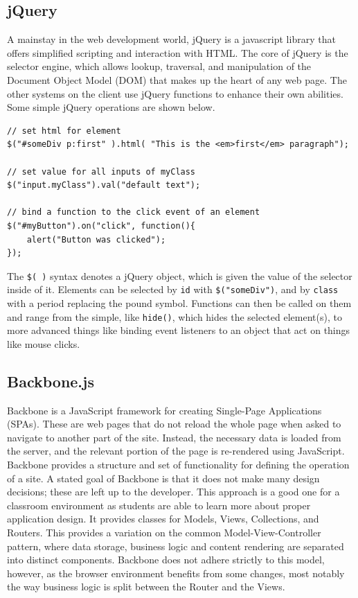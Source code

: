 \documentclass[12pt]{article}
\newcommand{\comment}[1]{{\bf \tt  {#1}}}
\newcommand{\emcomment}[1]{\textcolor{ForestGreen}{\comment{Elena: {#1}}}}
\newcommand{\code}[1]{{\texttt {#1}}}
\begin{document}
\subsection{jQuery}\label{sec:jquery}
A mainstay in the web development world, jQuery is a javascript library that offers simplified scripting and interaction with HTML. The core of jQuery is the selector engine, which allows lookup, traversal, and manipulation of the Document Object Model (DOM) that makes up the heart of any web page. The other systems on the client use jQuery functions to enhance their own abilities. Some simple jQuery operations are shown below.
\begin{verbatim}
// set html for element
$("#someDiv p:first" ).html( "This is the <em>first</em> paragraph");

// set value for all inputs of myClass
$("input.myClass").val("default text");

// bind a function to the click event of an element
$("#myButton").on("click", function(){
    alert("Button was clicked");
});
\end{verbatim}
The \code{\$( )} syntax denotes a jQuery object, which is given the value of the selector inside of it. Elements can be selected by \code{id} with \code{\$("someDiv")}, and by \code{class} with a period replacing the pound symbol. Functions can then be called on them and range from the simple, like \code{hide()}, which hides the selected element(s), to more advanced things like binding event listeners to an object that act on things like mouse clicks.


\subsection{Backbone.js}\label{sec:backbone}
Backbone is a JavaScript framework for creating Single-Page Applications (SPAs). These are web pages that do not reload the whole page when asked to navigate to another part of the site. Instead, the necessary data is loaded from the server, and the relevant portion of the page is re-rendered using JavaScript. Backbone provides a structure and set of functionality for defining the operation of a site. A stated goal of Backbone is that it does not make many design decisions; these are left up to the developer. This approach is a good one for a classroom environment as students are able to learn more about proper application design. It provides classes for Models, Views, Collections, and Routers. This provides a variation on the common Model-View-Controller pattern, where data storage, business logic and content rendering are separated into distinct components. Backbone does not adhere strictly to this model, however, as the browser environment benefits from some changes, most notably the way business logic is split between the Router and the Views.
\end{document}
